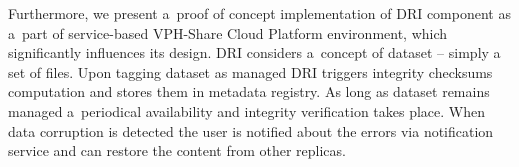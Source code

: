 Furthermore, we present a~proof of concept implementation of DRI component as a~part of service-based
VPH-Share Cloud Platform environment, which significantly influences its design. DRI considers a~concept
of dataset -- simply a set of files. Upon tagging dataset as managed DRI triggers
integrity checksums computation and stores them in metadata registry. As long as dataset remains managed
a~periodical availability and integrity verification takes place. When data corruption is detected the
user is notified about the errors via notification service and can restore the content from other replicas.


